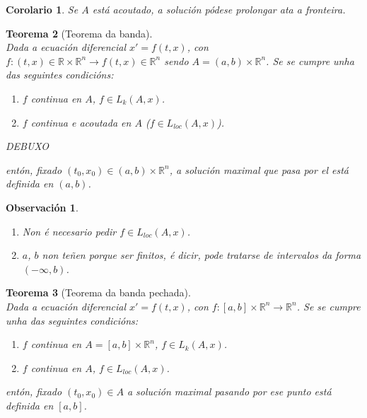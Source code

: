 \documentclass[11pt, a4paper,twoside]{article}
\theoremstyle{theorem-style}  %
\newtheorem{theorem}{Teorema}[section]  %
\newtheorem{corollary}[theorem]{Corolario} %
\theoremstyle{definition-style}
\newtheorem*{observation}{Observación} %
\theoremstyle{example-style}
\begin{document}
\begin{corollary}
	Se $A$ está acoutado, a solución pódese prolongar ata a fronteira.
\end{corollary}
\begin{theorem}[Teorema da banda]\label{banda} \ \\ 
	Dada a ecuación diferencial $x' = f(t, x)$, con $f: (t, x) \in \mathbb{R} \times \mathbb{R}^n \longrightarrow f(t, x) \in \mathbb{R}^n$ sendo $A = (a, b) \times \mathbb{R}^n$. Se se cumpre unha das seguintes condicións:
	\begin{enumerate}
		\item  $f$ continua en $A$, $f \in L_k (A, x)$.
		\item  $f$ continua e acoutada en $A$ ($f \in L_{loc} (A, x)$).
	\end{enumerate}
	
	DEBUXO
	
	entón, fixado $(t_0, x_0) \in (a, b) \times \mathbb{R}^n$, a solución maximal que pasa por el está definida en $(a, b)$.
\end{theorem}
\begin{observation} \ 
	\begin{enumerate}
		\item Non é necesario pedir $f \in L_{loc} (A, x)$.
		\item $a$, $b$ non teñen porque ser finitos, é dicir, pode tratarse de intervalos da forma $(- \infty, b)$.
	\end{enumerate}
\end{observation}
\begin{theorem}[Teorema da banda pechada] \label{bandacerrada} \ \\
	Dada a ecuación diferencial $x' = f(t, x)$, con $f: [a, b] \times \mathbb{R}^n \longrightarrow \mathbb{R}^n$. Se se cumpre unha das seguintes condicións:
	\begin{enumerate}
		\item $f$ continua en $A = [a, b] \times \mathbb{R}^n$, $f \in L_k (A, x)$.
		\item $f$ continua en $A$, $f \in L_{loc} (A, x)$.
	\end{enumerate}
	entón, fixado $(t_0, x_0) \in A$ a solución maximal pasando por ese punto está definida en $[a, b]$. 
\end{theorem}
\end{document}
